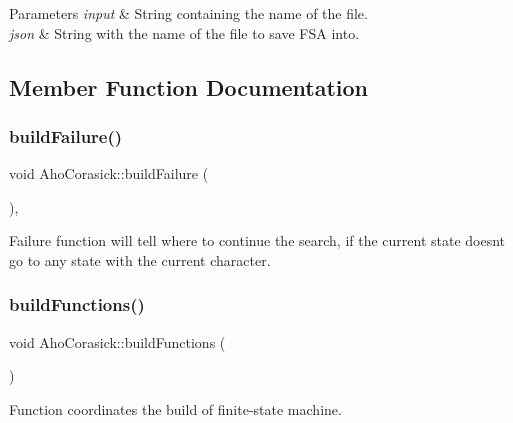 \begin{DoxyParams}{Parameters}
{\em input} & String containing the name of the file. \\
\hline
{\em json} & String with the name of the file to save F\+SA into. \\
\hline
\end{DoxyParams}


\subsection{Member Function Documentation}
\mbox{\label{classAhoCorasick_a8dae847b2d60d7844ae1677026f4eab5}} 
\subsubsection{\texorpdfstring{build\+Failure()}{buildFailure()}}
{\footnotesize\ttfamily void Aho\+Corasick\+::build\+Failure (\begin{DoxyParamCaption}{ }\end{DoxyParamCaption})\hspace{0.3cm}{\ttfamily [inline]}, {\ttfamily [private]}}

Failure function will tell where to continue the search, if the current state doesn\textquotesingle{}t go to any state with the current character. \mbox{\label{classAhoCorasick_a4562e5c069beb443c120856445e159c8}} 
\subsubsection{\texorpdfstring{build\+Functions()}{buildFunctions()}}
{\footnotesize\ttfamily void Aho\+Corasick\+::build\+Functions (\begin{DoxyParamCaption}{ }\end{DoxyParamCaption})\hspace{0.3cm}{\ttfamily [inline]}}

Function coordinates the build of finite-\/state machine. \mbox{\label{classAhoCorasick_a54a087f0c1434bc9b753d8ab2d0dad1c}} 
